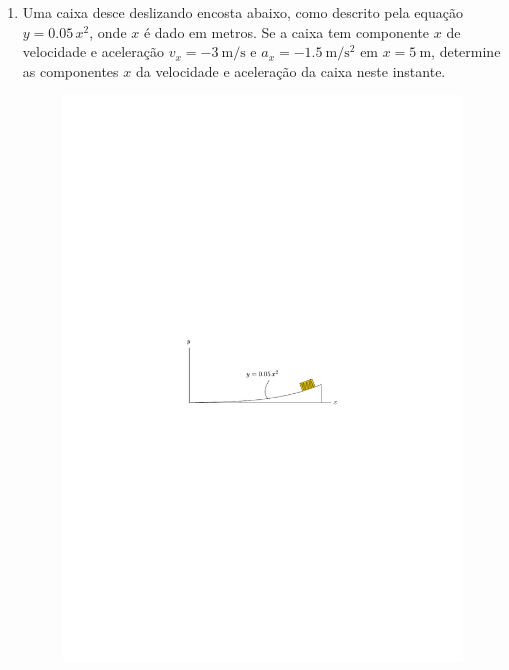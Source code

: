 \documentclass[a4paper,12pt]{article}
\begin{document}
\begin{enumerate}
		onde $v$ é dado em \SI{}{\meter/\second} e a direção positiva é para baixo. Se o corpo é solto a partir do repouso a uma altitude muito elevada, determine (a) a velocidade quando $t=\SI{5}{\second}$ e (b) a velocidade máxima possível ou final do corpo (quando $t\rightarrow\infty$)
		
		
		\textbf{Resposta}
		$
		\begin{cases}
		\text{(a) }v=\SI{45.5}{\meter/\second}\\
		\text{(b) }v=\SI{100}{\meter/\second}
		\end{cases}
		$
		
		\item Uma caixa desce deslizando encosta abaixo, como descrito pela equação $y=0.05\,x^{2}$, onde $x$ é dado em metros. Se a caixa tem componente $x$ de velocidade e aceleração $v_{x}=\SI{-3}{\meter/\second}$ e $a_{x}=\SI{-1.5}{\meter/\second^{2}}$ em $x=\SI{5}{\meter}$, determine as componentes $x$ da velocidade e aceleração da caixa neste instante.
		
		\begin{figure}[h!]
			\centering
			\includegraphics[scale=1.3]{images/draw_2.pdf}
		\end{figure}
		

\end{enumerate}
\end{document}
